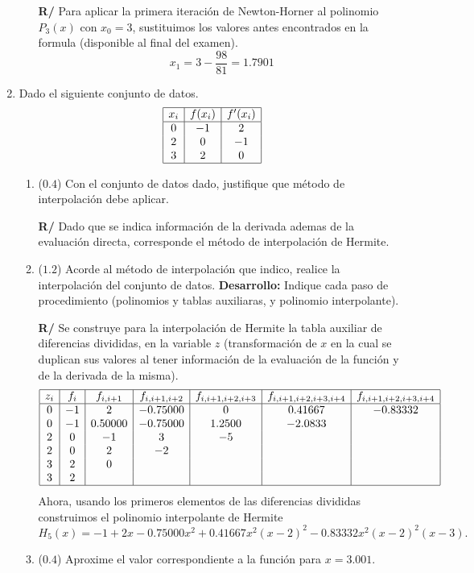 \documentclass[12pt]{article}
\begin{document}
\begin{enumerate}[leftmargin=*,widest=9]
\begin{enumerate}[label=\alph*]
\textbf{R/} Para aplicar la primera iteración de Newton-Horner al polinomio \(P_3(x)\) con \(x_0 = 3\), sustituimos los valores antes encontrados en la formula (disponible al final del examen).
  \begin{equation*}
  x_1 = 3 - \frac{98}{81} = 1.7901
  \end{equation*}
   \end{enumerate}
   \item Dado el siguiente conjunto de datos.
   \begin{equation*}
   \begin{array}{|c|c|c|}
   \hline
   x_i & f(x_i) & f^\prime(x_i) \\
   \hline
   0 & -1 & 2\\
   2 & 0 & -1\\
   3 & 2 & 0\\
   \hline
   \end{array}
   \end{equation*}
   \begin{enumerate}[label=\alph*]
   \item (\(0.4\)) Con el conjunto de datos dado, justifique que método de interpolación debe aplicar.

\textbf{R/} Dado que se indica información de la derivada ademas de la evaluación directa, corresponde el método de interpolación de Hermite.
   \item (\(1.2\)) Acorde al método de interpolación que indico, realice la interpolación del conjunto de datos. \textbf{Desarrollo:} Indique cada paso de procedimiento (polinomios y tablas auxiliaras, y polinomio interpolante).

\textbf{R/} Se construye para la interpolación de Hermite la tabla auxiliar de diferencias divididas, en la variable \(z\) (transformación de \(x\) en la cual se duplican sus valores al tener información de la evaluación de la función y de la derivada de la misma).
\begin{equation*}
\begin{array}{|c|c|c|c|c|c|c|}
\hline
z_i & f_i & f_{i, i+1} & f_{i, i+1, i+2} & f_{i, i+1, i+2, i+3}& f_{i, i+1, i+2, i+3, i+4} & f_{i, i+1, i+2, i+3, i+4}\\
\hline
0 & -1 & 2       & -0.75000 & 0       & 0.41667 & -0.83332\\
0 & -1 & 0.50000 & -0.75000 & 1.2500  & -2.0833 &\\
2 & 0  & -1      & 3   & -5 &&\\
2 & 0  & 2  & -2  &&&\\
3 & 2  & 0       &&&&\\
3 & 2  &&&&&\\
\hline
\end{array}
\end{equation*}
Ahora, usando los primeros elementos de las diferencias divididas construimos el polinomio interpolante de Hermite
\[H_5(x) =-1 + 2x -0.75000x^2 + 0.41667x^2(x-2)^2-0.83332 x^2(x-2)^2(x-3). \]
\item (\(0.4\)) Aproxime el valor correspondiente a la función para \(x=3.001\).


\end{enumerate}
\end{enumerate}
\end{document}
